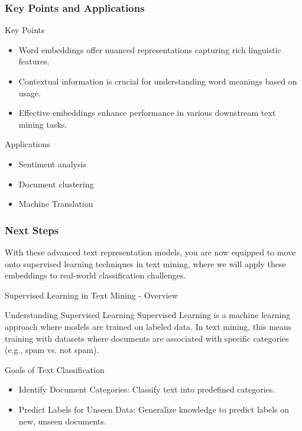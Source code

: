 \documentclass[aspectratio=169]{beamer}
\begin{document}
\begin{frame}[fragile]
    \frametitle{Key Points and Applications}
    \begin{block}{Key Points}
        \begin{itemize}
            \item Word embeddings offer nuanced representations capturing rich linguistic features.
            \item Contextual information is crucial for understanding word meanings based on usage.
            \item Effective embeddings enhance performance in various downstream text mining tasks.
        \end{itemize}
    \end{block}

    \begin{block}{Applications}
        \begin{itemize}
            \item Sentiment analysis
            \item Document clustering
            \item Machine Translation
        \end{itemize}
    \end{block}
\end{frame}

\begin{frame}[fragile]
    \frametitle{Next Steps}
    With these advanced text representation models, you are now equipped to move onto supervised learning techniques in text mining, where we will apply these embeddings to real-world classification challenges.
\end{frame}

\begin{frame}[fragile]{Supervised Learning in Text Mining - Overview}
    \begin{block}{Understanding Supervised Learning}
        Supervised Learning is a machine learning approach where models are trained on labeled data. 
        In text mining, this means training with datasets where documents are associated with specific categories (e.g., spam vs. not spam).
    \end{block}
    
    \begin{block}{Goals of Text Classification}
        \begin{itemize}
            \item Identify Document Categories: Classify text into predefined categories.
            \item Predict Labels for Unseen Data: Generalize knowledge to predict labels on new, unseen documents.
        \end{itemize}
    \end{block}
\end{frame}
\end{document}
